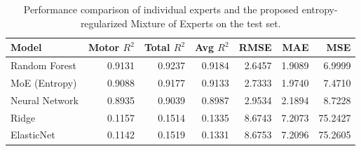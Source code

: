 \begin{table}[htbp]
	\centering
	\caption{Performance comparison of individual experts and the proposed entropy-regularized Mixture of Experts on the test set.}
	\label{tab:performance_comparison}
	\begin{tabular}{lrrrrrr}
		\hline
		Model & Motor $R^2$ & Total $R^2$ & Avg $R^2$ & RMSE & MAE & MSE \\
		\hline
		Random Forest & 0.9131 & 0.9237 & 0.9184 & 2.6457 & 1.9089 & 6.9999 \\
		MoE (Entropy) & 0.9088 & 0.9177 & 0.9133 & 2.7333 & 1.9740 & 7.4710 \\
		Neural Network & 0.8935 & 0.9039 & 0.8987 & 2.9534 & 2.1894 & 8.7228 \\
		Ridge & 0.1157 & 0.1514 & 0.1335 & 8.6743 & 7.2073 & 75.2427 \\
		ElasticNet & 0.1142 & 0.1519 & 0.1331 & 8.6753 & 7.2096 & 75.2605 \\
		\hline
	\end{tabular}
\end{table}